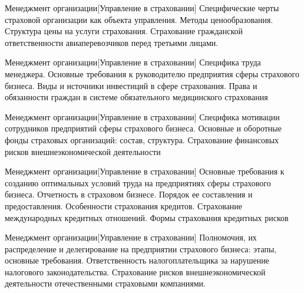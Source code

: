 \documentclass[
	11pt,
	a4paper,
	]
	{article}
\begin{document}
\begin{minipage}[t][\miniH]{\miniL}\centering
	 {Менеджмент организации}[Управление в страховании]
		{
			Специфические черты страховой организации как объекта управления.
		}{
			Методы ценообразования. Структура цены на услуги страхования.
		}{
			Страхование гражданской ответственности авиаперевозчиков перед третьими лицами.
		}
	\lowGE
\end{minipage}

\vfill



\begin{minipage}[t][\miniH]{\miniL}\centering
	 {Менеджмент организации}[Управление в страховании]
		{
			Специфика труда менеджера. Основные требования к руководителю предприятия сферы страхового бизнеса.
		}{
			Виды и источники инвестиций в сфере страхования.
		}{
			Права и обязанности граждан в системе обязательного медицинского страхования
		}
	\lowGE
\end{minipage}





\begin{minipage}[t][\miniH]{\miniL}\centering
	 {Менеджмент организации}[Управление в страховании]
		{
			Специфика мотивации сотрудников предприятий сферы страхового бизнеса.
		}{
			Основные и оборотные фонды страховых организаций: состав, структура.
		}{
			Страхование финансовых рисков внешнеэкономической деятельности
		}
	\lowGE
\end{minipage}

\vfill



\begin{minipage}[t][\miniH]{\miniL}\centering
	 {Менеджмент организации}[Управление в страховании]
		{
			Основные требования к созданию оптимальных условий труда на предприятиях сферы страхового бизнеса.
		}{
			Отчетность в страховом бизнесе. Порядок ее составления и предоставления.
		}{
			Особенности страхования кредитов. Страхование международных кредитных отношений. Формы страхования кредитных рисков
		}
	\lowGE
\end{minipage}

\vfill



\begin{minipage}[t][\miniH]{\miniL}\centering
	 {Менеджмент организации}[Управление в страховании]
		{
			Полномочия, их распределение и делегирование на предприятии страхового бизнеса: этапы, основные требования.
		}{
			Ответственность налогоплательщика за нарушение налогового законодательства.
		}{
			Страхование рисков внешнеэкономической деятельности отечественными страховыми компаниями.
		}
	\lowGE
\end{minipage}
\end{document}
